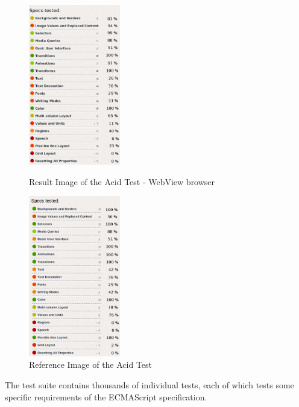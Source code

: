 \begin{figure}
\begin{minipage}[t]{7cm}
	\centering
	\includegraphics[width=4cm]{./img/tech-ana/css3_webview.png}
	\caption{Result Image of the Acid Test - WebView browser}
	\label{fig:css3_webview}
\end{minipage}
\hfill
\begin{minipage}[t]{7cm}
	\centering
	\includegraphics[width=4cm]{./img/tech-ana/css3_chrome.png}
	\caption{Reference Image of the Acid Test}
	\label{fig:css3_chrome}
\end{minipage}
\end{figure}


The test suite contains thousands of individual tests, each of which tests some specific requirements of the ECMAScript specification.

